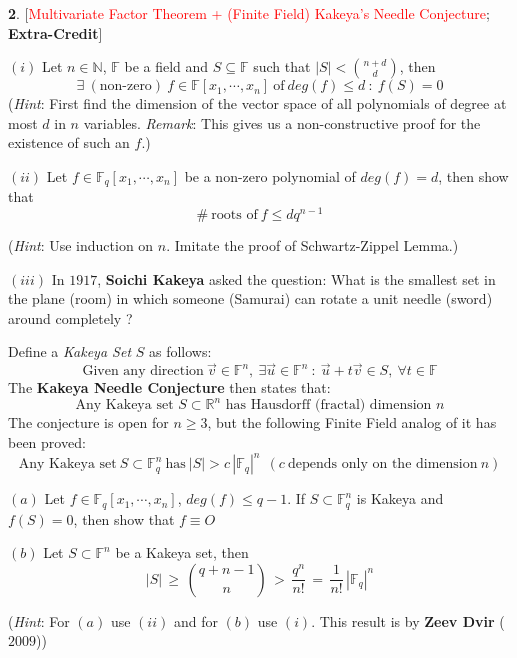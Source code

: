 \documentclass[10pt]{article}
\begin{document}
\textbf{2}. [\textcolor{red}{Multivariate Factor Theorem + (Finite Field) Kakeya's Needle Conjecture}; \textbf{Extra-Credit}]\medskip

$(i)$ Let $n\in \mathbb{N}$, $\mathbb{F}$ be a field and $S\subseteq \mathbb{F}$ such that $|S|<\binom{n+d}{d}$, then $$\boxed{\exists~(\text{non-zero})~f\in \mathbb{F}[x_1,\cdots, x_n]~ \text{of}~ deg(f)\le d~:~ f(S)=0}$$ (\emph{Hint}: First find the dimension of the vector space of all polynomials of degree at most $d$ in $n$ variables. \emph{Remark}: This gives us a non-constructive proof for the existence of such an $f$.)\medskip

$(ii)$ Let $f\in \mathbb{F}_q[x_1,\cdots, x_n]$ be a non-zero polynomial of $deg(f)=d$, then show that $$\boxed{\#~ \text{roots of}~ f\le dq^{n-1}}$$

(\emph{Hint}: Use induction on $n$. Imitate the proof of Schwartz-Zippel Lemma.)\medskip

$(iii)$ In $1917$, \textbf{Soichi Kakeya} asked the question: What is the smallest set in the plane (room) in which someone (Samurai) can rotate a unit needle (sword) around completely ?\medskip

Define a \emph{Kakeya Set} $S$ as follows: $$\text{Given any direction}~ \overrightarrow{v}\in \mathbb{F}^n,~ \exists \overrightarrow{u}\in \mathbb{F}^n~:~\overrightarrow{u}+t\overrightarrow{v}\in S,~ \forall t\in \mathbb{F}$$ The \textbf{Kakeya Needle Conjecture} then states that: $$\boxed{\text{Any Kakeya set}\,\, S\subset \mathbb{R}^n\,\, \text{has Hausdorff (fractal) dimension}\,\, n}$$ The conjecture is open for $n\ge 3$, but the following Finite Field analog of it has been proved: $$\boxed{\text{Any Kakeya set}~ S\subset \mathbb{F}_q^n~ \text{has}~ |S|>c\,|\mathbb{F}_q|^n ~~ (c~\text{depends only on the dimension}~ n)}$$

\hspace{0.2 in} $(a)$ Let $f\in \mathbb{F}_q[x_1,\cdots, x_n]$, $deg(f)\le q-1$. If $S\subset \mathbb{F}_q^n$ is Kakeya and $f(S)=0$, then show that $f\equiv O$ \medskip

\hspace{0.2 in} $(b)$ Let $S\subset \mathbb{F}^n$ be a Kakeya set, then $$|S|\,\ge\,\binom{q+n-1}{n}\,>\, \frac{q^n}{n!}\,=\,\frac{1}{n!}\,|\mathbb{F}_q|^n$$

\hspace{0.2 in}(\emph{Hint}: For $(a)$ use $(ii)$ and for $(b)$ use $(i)$. This result is by \textbf{Zeev Dvir} ($2009$))

\pagebreak
\end{document}
